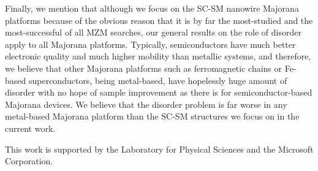 \documentclass[aps,prmaterials,twocolumn,superscriptaddress,longbibliography]{revtex4-2}
\begin{document}
Finally, we mention that although we focus on the SC-SM nanowire Majorana platforms because of the obvious reason that it is by far the most-studied and the most-successful of all MZM searches, our general results on the role of disorder apply to all Majorana platforms.  Typically, semiconductors have much better electronic quality and much higher mobility than metallic systems, and therefore, we believe that other Majorana platforms such as ferromagnetic chains or Fe-based superconductors, being metal-based, have hopelessly huge amount of disorder with no hope of sample improvement as there is for semiconductor-based Majorana devices.  We believe that the disorder problem is far worse in any metal-based Majorana platform than the SC-SM structures we focus on in the current work.

This work is supported by the Laboratory for Physical Sciences and the Microsoft Corporation.


\appendix
\onecolumngrid
\end{document}
